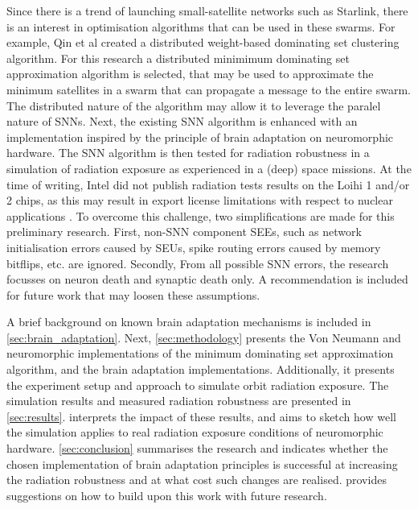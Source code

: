Since there is a trend of launching small-satellite networks such as Starlink, there is an interest in optimisation algorithms that can be used in these swarms. For example, Qin et al created a distributed weight-based dominating set clustering algorithm. For this research a distributed minimimum dominating set approximation algorithm is selected, that may be used to approximate the minimum satellites in a swarm that can propagate a message to the entire swarm. The distributed nature of the algorithm may allow it to leverage the paralel nature of SNNs.
Next, the existing SNN algorithm is enhanced with an implementation inspired by the principle of brain adaptation on neuromorphic hardware. The SNN algorithm is then tested for radiation robustness in a simulation of radiation exposure as experienced in a (deep) space missions. At the time of writing, Intel did not publish radiation tests results on the Loihi 1 and/or 2 chips, as this may result in export license limitations with respect to nuclear applications \cite{INRC_meeting}. To overcome this challenge, two simplifications are made for this preliminary research. First, non-SNN component SEEs, such as network initialisation errors caused by SEUs, spike routing errors caused by memory bitflips, etc. are ignored. Secondly, From all possible SNN errors, the research focusses on neuron death and synaptic death only. A recommendation is included for future work that may loosen these assumptions. %

A brief background on known brain adaptation mechanisms is included in \cref{sec:brain_adaptation}. Next, \cref{sec:methodology} presents the Von Neumann and neuromorphic implementations of the minimum dominating set approximation algorithm, and the brain adaptation implementations. Additionally, it presents the experiment setup and approach to simulate orbit radiation exposure. The simulation results and measured radiation robustness are presented in \cref{sec:results}.  interprets the impact of these results, and aims to sketch how well the simulation applies to real radiation exposure conditions of neuromorphic hardware. \cref{sec:conclusion} summarises the research and indicates whether the chosen implementation of brain adaptation principles is successful at increasing the radiation robustness and at what cost such changes are realised. provides suggestions on how to build upon this work with future research.